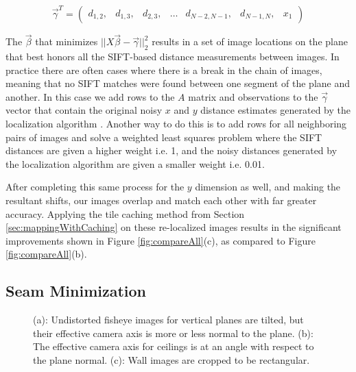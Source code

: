 \documentclass[10pt,twocolumn,letterpaper]{article}
\begin{document}
\[
\vec{\gamma}^T =
\begin{pmatrix}
  d_{1,2}, &d_{1,3}, &d_{2,3}, &\hdots &d_{N-2,N-1}, &d_{N-1,N}, &x_1
\end{pmatrix}
\]

The $\vec{\beta}$ that minimizes $||X \vec{\beta} -
\vec{\gamma}||_2^2$ results in a set of image locations on the plane
that best honors all the SIFT-based distance measurements between
images. In practice there are often cases where there is a break in
the chain of images, meaning that no SIFT matches were found between
one segment of the plane and another. In this case we add rows to the
$A$ matrix and observations to the $\vec{\gamma}$ vector that contain
the original noisy $x$ and $y$ distance estimates generated by the
localization algorithm \cite{chen2010indoor, liu2010indoor}. Another
way to do this is to add rows for all neighboring pairs of images and
solve a weighted least squares problem where the SIFT distances are
given a higher weight i.e. 1, and the noisy distances generated by the
localization algorithm \cite{chen2010indoor, liu2010indoor} are given
a smaller weight i.e. 0.01.

After completing this same process for the $y$ dimension as well, and
making the resultant shifts, our images overlap and match each other
with far greater accuracy. Applying the tile caching method from
Section \ref{sec:mappingWithCaching} on these re-localized images
results in the significant improvements shown in Figure
\ref{fig:compareAll}(c), as compared to Figure \ref{fig:compareAll}(b).


\subsection{Seam Minimization}
\label{sec:seamMinimization}

\begin{figure}
  \centering
  \centering
  \centering
  \caption{(a): Undistorted fisheye images for vertical planes are tilted, but their effective camera axis is more or less
    normal to the plane. (b): The effective camera axis for ceilings
    is at an angle with respect to the plane normal. (c): Wall images are cropped to be rectangular.}
  \label{fig:projectionAngles}
\end{figure}
\end{document}
